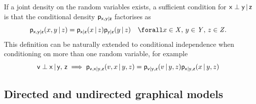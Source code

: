 If a joint density on the random variables exists, a sufficient condition for $\mathsf{x} \perp \mathsf{y} \operatorname{|} \mathsf{z}$ is that the conditional density $\mathsf{p}_{\mathsf{x},\mathsf{y}|\mathsf{z}}$ factorises as
\begin{equation}\label{eq:conditional-independence-densities}
  \pden{\rvar{x},\rvar{y}|\rvar{z}}(x,y \gvn z) =
  \pden{\rvar{x}|\rvar{z}}(x \gvn z)
  \pden{\rvar{y}|\rvar{z}}(y \gvn z)
  \quad \forall 
  x \in \set{X},\,
  y \in \set{Y},\,
  z \in \set{Z}.
\end{equation}
This definition can be naturally extended to conditional independence when conditioning on more than one random variable, for example
\begin{equation}\label{eq:conditional-independence-many-vars}
  \mathsf{v} \perp \mathsf{x} \operatorname{|} \mathsf{y},\,\mathsf{z} \implies
  \mathsf{p}_{\mathsf{v},\mathsf{x}|\mathsf{y},\mathsf{z}}(v,x \operatorname{|} y,z) =
  \mathsf{p}_{\mathsf{v}|\mathsf{y},\mathsf{z}}(v \operatorname{|} y,z)
  \mathsf{p}_{\mathsf{x}|\mathsf{y},\mathsf{z}}(x \operatorname{|} y,z)
\end{equation}


\subsection{Directed and undirected graphical models}

